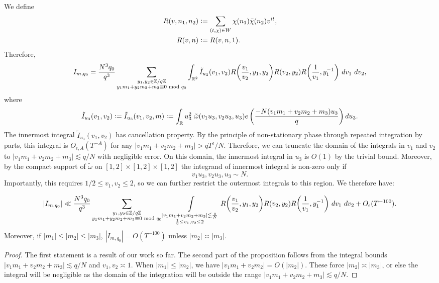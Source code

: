 We define \begin{align*}
	R(v,n_1,n_2)&\mathrel{\mathop:}= \sum_{(t,\chi)\in  W} 
	\chi({n_1})\bar{\chi}(n_2)v^{it},\\
	R(v,n)&\mathrel{\mathop:}= R(v,n,1).
\end{align*}
Therefore, \begin{equation*}
    I_{m,q_0} = \frac{N^3q_0}{q^3} \sum_{\substack{y_1,y_2 \in\mathbb{Z}/q\mathbb{Z} \\ y_1m_1+y_2m_2+m_3\equiv 0 \mod q_0}}\int_{\reals^2} \tilde{I}_{u_3}(v_1,v_2)  R{\left(\frac{v_1}{v_2},y_1,y_2\right)}R {\left(v_2,y_2\right)}R{\left(\frac{1}{v_1},y_1^{-1}\right)} \ dv_1\ dv_2,
\end{equation*}
    where\[
     \tilde{I}_{u_3}(v_1,v_2)\defeq \tilde{I}_{u_3}(v_1,v_2,m)\defeq \int_\reals u_3^2 \ \tilde{\omega}(v_1u_3,v_2u_3,u_3) e\left(\frac{-N(v_1m_1+v_2m_2+m_3)u_3}{q}\right)  du_3.\]
The innermost integral $\tilde{I}_{u_3}(v_1,v_2)$ has cancellation property. By the principle of non-stationary phase through repeated integration by parts, this integral is $O_{\epsilon, A}(T^{-A})$ for any $|v_1m_1+v_2m_2+m_3|>qT^\epsilon/N$. Therefore, we can truncate the domain of the integrals in $v_1$ and $v_2$ to  $|v_1m_1+v_2m_2+m_3|\lesssim q/N$ with negligible error. On this domain, the innermost integral in $u_3$ is $O(1)$ by the trivial bound. Moreover, by the compact support of $\tilde{\omega}$ on $[1,2]\times [1,2]\times [1,2]$  the integrand of innermost integral is non-zero only if \[
v_1u_3,v_2u_3,u_3\sim N.
\]
Importantly, this requires $1/2 \leq v_1,v_2 \leq 2$, so we can further restrict the outermost integrals to this region. 
We therefore have: 
\begin{proposition} \label{domainreduction}
    \[
    |I_{m,q_0}|\ll \frac{N^3q_0}{q^3}\sum_{\substack{y_1,y_2 \in\mathbb{Z}/q\mathbb{Z} \\ y_1m_1+y_2m_2+m_3\equiv 0 \mod q_0}}\int\displaylimits_{\substack{
        |v_1m_1+v_2m_2+m_3|\lesssim \frac{q}{N}\\
        \frac{1}{2}\leq v_1,v_2\leq 2
}}  R{\left(\frac{v_1}{v_2},y_1,y_2\right)}R {\left(v_2,y_2\right)}R{\left(\frac{1}{v_1},y_1^{-1}\right)} \ dv_1\ dv_2+O_{\epsilon}(T^{-100}).
    \]
    Moreover, if $|m_1|\leq|m_2|\leq |m_3|$, $|I_{m,q_0}|=O(T^{-100})$ unless $|m_2|\asymp|m_3|$.
\end{proposition}
\begin{proof}
    The first statement is a result of our work so far. The second part of the proposition follows from the integral bounds $|v_1m_1+v_2m_2+m_3|\lesssim q/N$
    and $v_1,v_2\asymp 1$. When $|m_1|\leq |m_2|$, we have $|v_1m_1+v_2m_2|=O(|m_2|)$. These force $|m_2| \asymp|m_3|$, or else the integral will be negligible as the domain of the integration will be outside the range $|v_1m_1+v_2m_2+m_3|\lesssim q/N$.
\end{proof}
